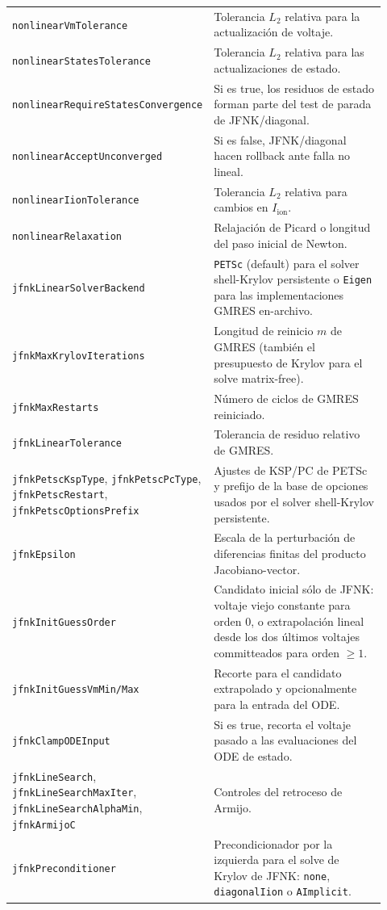 \documentclass[11pt,a4paper]{article}
\newcommand{\code}[1]{\texttt{\small #1}}
\newcommand{\Iion}{I_{\mathrm{ion}}}
\begin{document}
\begin{longtable}{@{}p{0.34\linewidth}p{0.58\linewidth}@{}}
\code{nonlinearVmTolerance} & Tolerancia $L_2$ relativa para la actualización de voltaje. \\
\code{nonlinearStatesTolerance} & Tolerancia $L_2$ relativa para las actualizaciones de estado. \\
\code{nonlinearRequireStatesConvergence} & Si es true, los residuos de estado forman parte del test de parada de JFNK/diagonal. \\
\code{nonlinearAcceptUnconverged} & Si es false, JFNK/diagonal hacen rollback ante falla no lineal. \\
\code{nonlinearIionTolerance} & Tolerancia $L_2$ relativa para cambios en $\Iion$. \\
\code{nonlinearRelaxation} & Relajación de Picard o longitud del paso inicial de Newton. \\
\code{jfnkLinearSolverBackend} & \code{PETSc} (default) para el solver shell-Krylov persistente o \code{Eigen} para las implementaciones GMRES en-archivo. \\
\code{jfnkMaxKrylovIterations} & Longitud de reinicio $m$ de GMRES (también el presupuesto de Krylov para el solve matrix-free). \\
\code{jfnkMaxRestarts} & Número de ciclos de GMRES reiniciado. \\
\code{jfnkLinearTolerance} & Tolerancia de residuo relativo de GMRES. \\
\code{jfnkPetscKspType}, \code{jfnkPetscPcType}, \code{jfnkPetscRestart}, \code{jfnkPetscOptionsPrefix} & Ajustes de KSP/PC de PETSc y prefijo de la base de opciones usados por el solver shell-Krylov persistente. \\
\code{jfnkEpsilon} & Escala de la perturbación de diferencias finitas del producto Jacobiano-vector. \\
\code{jfnkInitGuessOrder} & Candidato inicial sólo de JFNK: voltaje viejo constante para orden 0, o extrapolación lineal desde los dos últimos voltajes committeados para orden $\ge 1$. \\
\code{jfnkInitGuessVmMin/Max} & Recorte para el candidato extrapolado y opcionalmente para la entrada del ODE. \\
\code{jfnkClampODEInput} & Si es true, recorta el voltaje pasado a las evaluaciones del ODE de estado. \\
\code{jfnkLineSearch}, \code{jfnkLineSearchMaxIter}, \code{jfnkLineSearchAlphaMin}, \code{jfnkArmijoC} & Controles del retroceso de Armijo. \\
\code{jfnkPreconditioner} & Precondicionador por la izquierda para el solve de Krylov de JFNK: \code{none}, \code{diagonalIion} o \code{AImplicit}. \\

\end{longtable}
\end{document}
